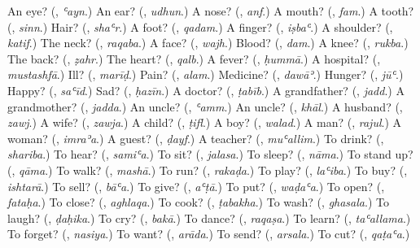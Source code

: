 \begin{tcolorbox}[breakable,colback=teal!4,colframe=teal!35!black,title={Before you move on}]
An eye? (\textbf{}, \emph{ʿayn}.) An ear? (\textbf{}, \emph{udhun}.) A nose? (\textbf{}, \emph{anf}.) A mouth? (\textbf{}, \emph{fam}.) A tooth? (\textbf{}, \emph{sinn}.) Hair? (\textbf{}, \emph{shaʿr}.) A foot? (\textbf{}, \emph{qadam}.) A finger? (\textbf{}, \emph{iṣbaʿ}.) A shoulder? (\textbf{}, \emph{katif}.) The neck? (\textbf{}, \emph{raqaba}.) A face? (\textbf{}, \emph{wajh}.) Blood? (\textbf{}, \emph{dam}.) A knee? (\textbf{}, \emph{rukba}.) The back? (\textbf{}, \emph{ẓahr}.) The heart? (\textbf{}, \emph{qalb}.) A fever? (\textbf{}, \emph{ḥummā}.) A hospital? (\textbf{}, \emph{mustashfā}.) Ill? (\textbf{}, \emph{marīḍ}.) Pain? (\textbf{}, \emph{alam}.) Medicine? (\textbf{}, \emph{dawāʾ}.) Hunger? (\textbf{}, \emph{jūʿ}.) Happy? (\textbf{}, \emph{saʿīd}.) Sad? (\textbf{}, \emph{ḥazīn}.) A doctor? (\textbf{}, \emph{ṭabīb}.) A grandfather? (\textbf{}, \emph{jadd}.) A grandmother? (\textbf{}, \emph{jadda}.) An uncle? (\textbf{}, \emph{ʿamm}.) An uncle? (\textbf{}, \emph{khāl}.) A husband? (\textbf{}, \emph{zawj}.) A wife? (\textbf{}, \emph{zawja}.) A child? (\textbf{}, \emph{ṭifl}.) A boy? (\textbf{}, \emph{walad}.) A man? (\textbf{}, \emph{rajul}.) A woman? (\textbf{}, \emph{imraʾa}.) A guest? (\textbf{}, \emph{ḍayf}.) A teacher? (\textbf{}, \emph{muʿallim}.) To drink? (\textbf{}, \emph{shariba}.) To hear? (\textbf{}, \emph{samiʿa}.) To sit? (\textbf{}, \emph{jalasa}.) To sleep? (\textbf{}, \emph{nāma}.) To stand up? (\textbf{}, \emph{qāma}.) To walk? (\textbf{}, \emph{mashā}.) To run? (\textbf{}, \emph{rakaḍa}.) To play? (\textbf{}, \emph{laʿiba}.) To buy? (\textbf{}, \emph{ishtarā}.) To sell? (\textbf{}, \emph{bāʿa}.) To give? (\textbf{}, \emph{aʿṭā}.) To put? (\textbf{}, \emph{waḍaʿa}.) To open? (\textbf{}, \emph{fataḥa}.) To close? (\textbf{}, \emph{aghlaqa}.) To cook? (\textbf{}, \emph{ṭabakha}.) To wash? (\textbf{}, \emph{ghasala}.) To laugh? (\textbf{}, \emph{ḍaḥika}.) To cry? (\textbf{}, \emph{bakā}.) To dance? (\textbf{}, \emph{raqaṣa}.) To learn? (\textbf{}, \emph{taʿallama}.) To forget? (\textbf{}, \emph{nasiya}.) To want? (\textbf{}, \emph{arāda}.) To send? (\textbf{}, \emph{arsala}.) To cut? (\textbf{}, \emph{qaṭaʿa}.)
\end{tcolorbox}
